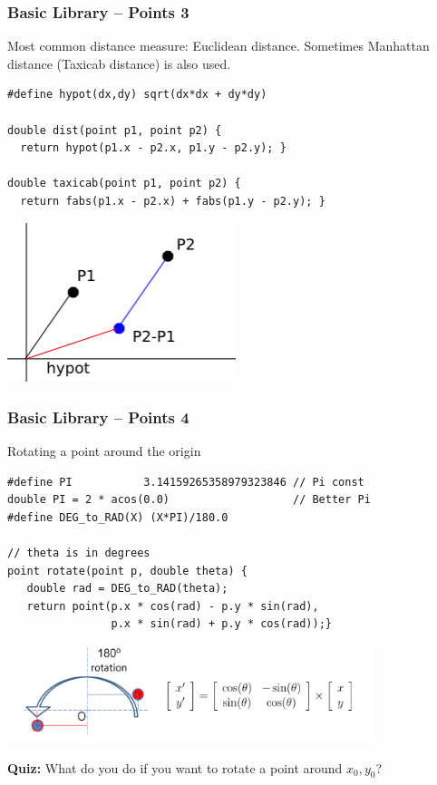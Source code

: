 \documentclass{beamer}
\begin{document}
\begin{frame}[fragile]
  \frametitle{Basic Library -- Points 3}
  {\smaller

    Most common distance measure: Euclidean distance. Sometimes
    Manhattan distance (Taxicab distance) is also used.

    \begin{exampleblock}{}
\begin{verbatim}
#define hypot(dx,dy) sqrt(dx*dx + dy*dy)

double dist(point p1, point p2) {
  return hypot(p1.x - p2.x, p1.y - p2.y); }

double taxicab(point p1, point p2) {
  return fabs(p1.x - p2.x) + fabs(p1.y - p2.y); }
\end{verbatim}
    \end{exampleblock}

    \begin{center}
      \includegraphics[width=0.5\textwidth]{../img/geom1}
    \end{center}
  }
\end{frame}

\begin{frame}[fragile]
  \frametitle{Basic Library -- Points 4}

  {\smaller

    \begin{exampleblock}{Rotating a point around the origin}
\begin{verbatim}
#define PI           3.14159265358979323846 // Pi const
double PI = 2 * acos(0.0)                   // Better Pi
#define DEG_to_RAD(X) (X*PI)/180.0

// theta is in degrees
point rotate(point p, double theta) {
   double rad = DEG_to_RAD(theta);
   return point(p.x * cos(rad) - p.y * sin(rad),
                p.x * sin(rad) + p.y * cos(rad));}
\end{verbatim}
    \end{exampleblock}
    \begin{center}
      \includegraphics[width=0.8\textwidth]{../img/rotation_halim}
    \end{center}

    {\bf Quiz:} What do you do if you want to rotate a point around $x_0, y_0$?
  }
\end{frame}
\end{document}

